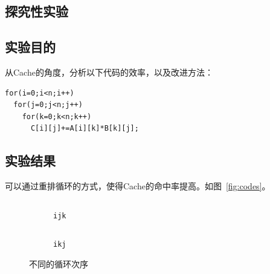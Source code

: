 \documentclass[a4paper,twoside]{article}
\begin{document}
\begin{spacing}{1.2}
\section{探究性实验}

\subsection{实验目的}

从Cache的角度，分析以下代码的效率，以及改进方法：
\begin{verbatim}
for(i=0;i<n;i++)
  for(j=0;j<n;j++)
    for(k=0;k<n;k++)
      C[i][j]+=A[i][k]*B[k][j];
\end{verbatim}

\subsection{实验结果}

可以通过重排循环的方式，使得Cache的命中率提高。如图~\ref{fig:codes}。
\begin{figure}[htb]
	\centering
	\begin{subfigure}{0.4\textwidth}
		\centering
		\caption{\texttt{ijk}}
		\inputminted{c}{../code/ijk.c}
	\end{subfigure}
	\begin{subfigure}{0.4\textwidth}
		\centering
		\caption{\texttt{ikj}}
		\inputminted{c}{../code/ikj.c}
	\end{subfigure}
	\caption{不同的循环次序}
\end{figure}


\end{spacing}
\end{document}
